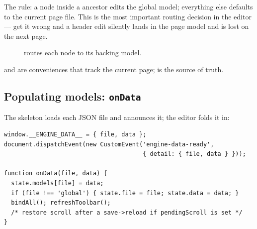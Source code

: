 \documentclass[11pt]{article}
\begin{document}
The rule: a node inside a \code{[data-edit-file="global"]} ancestor edits the
global model; everything else defaults to the current page file. This is the most
important routing decision in the editor --- get it wrong and a header edit
silently lands in the page model and is lost on the next page.

\begin{figure}[h]
\centering
{}
\caption{ routes each node to its backing model.}
\end{figure}

 and  are conveniences that track the current
page;  is the source of truth.

\subsection{Populating models: \texttt{onData}}

The skeleton loads each JSON file and announces it; the editor folds it in:

\begin{lstlisting}
window.__ENGINE_DATA__ = { file, data };
document.dispatchEvent(new CustomEvent('engine-data-ready',
                                       { detail: { file, data } }));

function onData(file, data) {
  state.models[file] = data;
  if (file !== 'global') { state.file = file; state.data = data; }
  bindAll(); refreshToolbar();
  /* restore scroll after a save->reload if pendingScroll is set */
}
\end{lstlisting}
\end{document}
